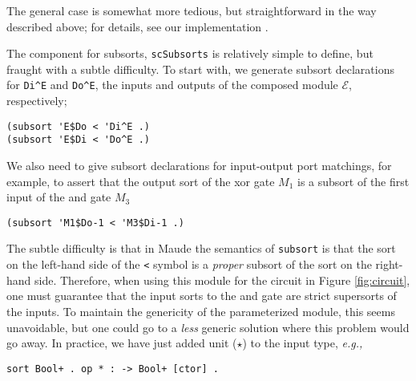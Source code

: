 \documentclass[copyright,creativecommons]{eptcs}
\newcommand{\eg}{\textit{e.g.,}}
\newcommand{\E}{\mathcal{E}}
\begin{document}
\noindent
The general case is somewhat more tedious, but straightforward in the way
described above; for details, see our implementation \cite{katelman_2010_01}.

The component for subsorts, {\tt scSubsorts} is relatively simple to define,
but fraught with a subtle difficulty. To start with, we generate subsort
declarations for {\tt Di\^{}E} and {\tt Do\^{}E}, the inputs and outputs of the
composed module $\E$, respectively;

\begin{center}
\begin{small}
\begin{boxedminipage}{0.35\textwidth}
\begin{verbatim}
(subsort 'E$Do < 'Di^E .)
(subsort 'E$Di < 'Do^E .)
\end{verbatim}
\end{boxedminipage}
\end{small}
\end{center}

\noindent
We also need to give subsort declarations for input-output port matchings, for
example, to assert that the output sort of the xor gate $M_1$ is a subsort of
the first input of the and gate $M_3$

\begin{center}
\begin{small}
\begin{boxedminipage}{0.40\textwidth}
\begin{verbatim}
(subsort 'M1$Do-1 < 'M3$Di-1 .) 
\end{verbatim}
\end{boxedminipage}
\end{small}
\end{center}

\noindent
The subtle difficulty is that in Maude the semantics of {\tt subsort} is that
the sort on the left-hand side of the {\tt <} symbol is a \emph{proper} subsort
of the sort on the right-hand side. Therefore, when using this module for the
circuit in Figure \ref{fig:circuit}, one must guarantee that the input sorts to
the and gate are strict supersorts of the inputs. To maintain the genericity of
the parameterized module, this seems unavoidable, but one could go to a
\emph{less} generic solution where this problem would go away. In practice, we
have just added unit ($\star$) to the input type, \eg\

\begin{center}
\begin{small}
\begin{boxedminipage}{0.50\textwidth}
\begin{verbatim}
sort Bool+ . op * : -> Bool+ [ctor] .
\end{verbatim}
\end{boxedminipage}
\end{small}
\end{center}
\end{document}
